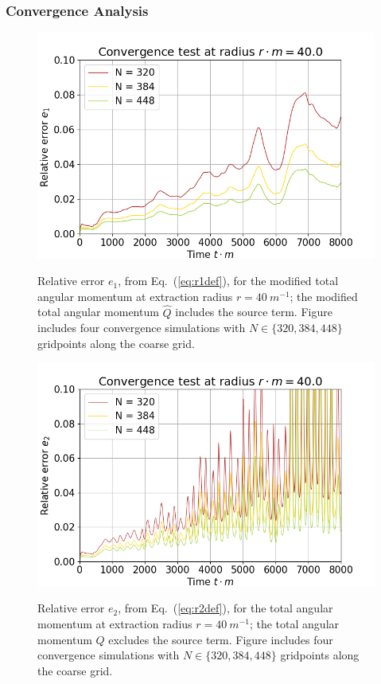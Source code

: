 \subsubsection{Convergence Analysis}\label{sect:conv}

\begin{figure}[h]
{\includegraphics[width=0.95\columnwidth]{png/paper_conv40_2.png}}
\caption{ Relative error $e_1$, from Eq.~(\ref{eq:r1def}), for the modified total angular momentum at extraction radius $r=40 ~m^{-1}$; the modified total angular momentum $\hat{Q}$ includes the source term. Figure includes four convergence simulations with $N\in\{320,384,448\}$ gridpoints along the coarse grid.}
\label{fig:r1}
\end{figure}
\begin{figure}[h]
{\includegraphics[width=0.95\columnwidth]{png/paper_conv40.png}}
\caption{ Relative error $e_2$, from Eq.~(\ref{eq:r2def}), for the total angular momentum at extraction radius $r=40 ~m^{-1}$; the total angular momentum ${Q}$ excludes the source term. Figure includes four convergence simulations with $N\in\{320,384,448\}$ gridpoints along the coarse grid.} 
\label{fig:r2}
\end{figure}

